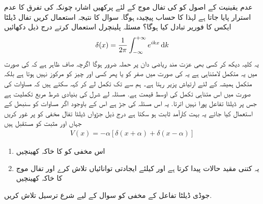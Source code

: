  عدم یقینیت کے اصول کو کی تفال موج کے لئے پرکھیں اشارہ چونکہ  کی تفرق کا عدم استرار پایا جاتا ہے لہذا  کا حساب پیچیدہ ہوگا. 
 سوال کا نتیجہ استعمال کریں 
 تفال ڈیلٹا ایکس  کا فوریر تبادل کیا ہوگا؟ مسئلہ پلینچرل استعمال کرتے درج ذیل دکھائیں 
\begin{align}\delta(x)=\frac{1}{2\pi}\int_{-\infty}^{+\infty} e^{ikx} \dif{k}\end{align}
 یہ کلیہ دیکھ کر کسی بھی عزت مند ریاضی دان پر حملہ ضرور ہوگا اگرچہ صاف ظاہر ہے کہ کی صورت میں یہ متکمل  لامتناہی ہے یہ کی صورت میں صفر کو یا پھر کسی اور چیز کو مرکوز نہیں ہوتا ہے بلکہ متکمل ہمیشہ کے لئے ارتیاش پزیر رہتا ہے۔ 
 ہم  سے  تک تکمل لے کر کہہ سکتے ہیں کہ مساوات  کی صورت میں اس متناہی تکمل کی اوسط قیمت ہے. مسئلہ لے شرل کی بنیادی شرط مربع تکملیت ہے جس پر ڈیلٹا تفاعل پورا نہیں اترتا.  یہ اس مسئلہ کی جڑ ہے اس کے باوجود اگر مساوات   کو سنبھل کے استعمال کیا جائے یہ بہت کارآمد ثابت ہو سکتا ہے
درج ذیل جڑواں ڈیلٹا تفال مخفی کو پر غور کریں جہاں  اور   مثبت کو مستقبل ہیں
\begin{align}V(x)=-\alpha[\delta(x+\alpha)+\delta(x-\alpha)]\end{align}
\begin{enumerate}
\item اس مخفی کو کا خاکہ کھینچیں
\item  یہ کتنی مقید حالات پیدا کرتا ہے اور کیلئے ایجادتی توانائیاں تلاش کرے اور تفال موج کا خاکہ کھینچیں
\end{enumerate}
جوڈی ڈیلٹا تفاعل کے مخفی کو سوال کے لیے شرع ترسیل تلاش کریں. 

